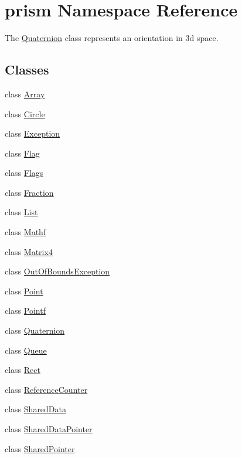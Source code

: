 \hypertarget{namespaceprism}{}\section{prism Namespace Reference}
\label{namespaceprism}


The \hyperlink{classprism_1_1_quaternion}{Quaternion} class represents an orientation in 3d space.  


\subsection*{Classes}
\begin{DoxyCompactItemize}
\item 
class \hyperlink{classprism_1_1_array}{Array}
\item 
class \hyperlink{classprism_1_1_circle}{Circle}
\item 
class \hyperlink{classprism_1_1_exception}{Exception}
\item 
class \hyperlink{classprism_1_1_flag}{Flag}
\item 
class \hyperlink{classprism_1_1_flags}{Flags}
\item 
class \hyperlink{classprism_1_1_fraction}{Fraction}
\item 
class \hyperlink{classprism_1_1_list}{List}
\item 
class \hyperlink{classprism_1_1_mathf}{Mathf}
\item 
class \hyperlink{classprism_1_1_matrix4}{Matrix4}
\item 
class \hyperlink{classprism_1_1_out_of_bounds_exception}{Out\+Of\+Bounds\+Exception}
\item 
class \hyperlink{classprism_1_1_point}{Point}
\item 
class \hyperlink{classprism_1_1_pointf}{Pointf}
\item 
class \hyperlink{classprism_1_1_quaternion}{Quaternion}
\item 
class \hyperlink{classprism_1_1_queue}{Queue}
\item 
class \hyperlink{classprism_1_1_rect}{Rect}
\item 
class \hyperlink{classprism_1_1_reference_counter}{Reference\+Counter}
\item 
class \hyperlink{classprism_1_1_shared_data}{Shared\+Data}
\item 
class \hyperlink{classprism_1_1_shared_data_pointer}{Shared\+Data\+Pointer}
\item 
class \hyperlink{classprism_1_1_shared_pointer}{Shared\+Pointer}

\end{DoxyCompactItemize}
